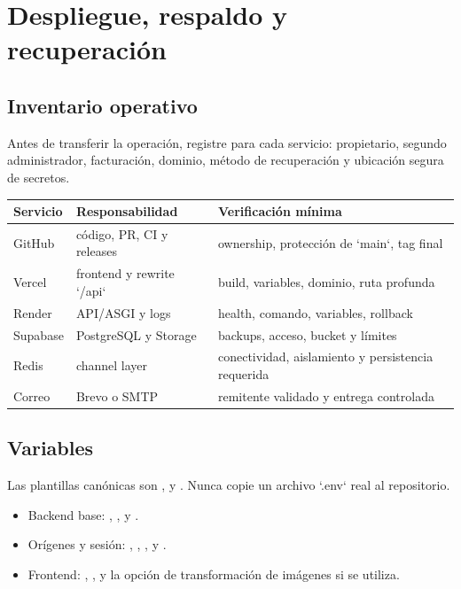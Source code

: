 \chapter{Despliegue, respaldo y recuperación}

\section{Inventario operativo}

Antes de transferir la operación, registre para cada servicio: propietario, segundo administrador,
facturación, dominio, método de recuperación y ubicación segura de secretos.

\begin{tabularx}{\textwidth}{@{}L{0.22\textwidth}Y Y@{}}
\toprule
\textbf{Servicio} & \textbf{Responsabilidad} & \textbf{Verificación mínima}\\
\midrule
GitHub & código, PR, CI y releases & ownership, protección de `main`, tag final\\
Vercel & frontend y rewrite `/api` & build, variables, dominio, ruta profunda\\
Render & API/ASGI y logs & health, comando, variables, rollback\\
Supabase & PostgreSQL y Storage & backups, acceso, bucket y límites\\
Redis & channel layer & conectividad, aislamiento y persistencia requerida\\
Correo & Brevo o SMTP & remitente validado y entrega controlada\\
\bottomrule
\end{tabularx}

\section{Variables}

Las plantillas canónicas son ,  y
. Nunca copie un archivo `.env` real al repositorio.

\begin{itemize}
  \item Backend base: , ,
   y .
  \item Orígenes y sesión: ,
  , ,
   y .
  \item Frontend: , ,
   y la opción de transformación de imágenes si se utiliza.
\end{itemize}

